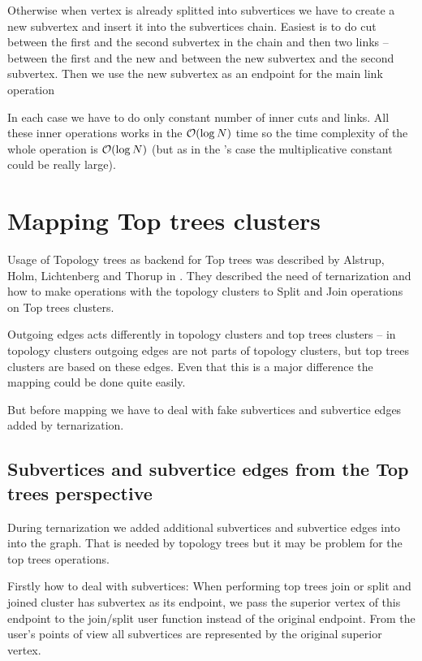 Otherwise when vertex is already splitted into subvertices we have to create
a new subvertex and insert it into the subvertices chain. Easiest is to do cut
between the first and the second subvertex in the chain and then two links --
between the first and the new and between the new subvertex and the second subvertex.
Then we use the new subvertex as an endpoint for the main link operation

In each case we have to do only constant number of inner cuts and links. All
these inner operations works in the ${\cal O}(\log N)$ time so the time complexity of
the whole \Link{} operation is ${\cal O}(\log N)$ (but as in the \Cut's case the
multiplicative constant could be really large).

\section{Mapping Top trees clusters}

Usage of Topology trees as backend for Top trees was described by Alstrup, Holm,
Lichtenberg and Thorup in \cite{TopTrees}. They described the need of
ternarization and how to make operations with the topology clusters to Split and
Join operations on Top trees clusters.

Outgoing edges acts differently in topology clusters and top trees clusters --
in topology clusters outgoing edges are not parts of topology clusters, but
top trees clusters are based on these edges. Even that this is a major
difference the mapping could be done quite easily.

But before mapping we have to deal with fake subvertices and subvertice edges
added by ternarization.

\subsection{Subvertices and subvertice edges from the Top trees perspective}

During ternarization we added additional subvertices and subvertice edges
into into the graph. That is needed by topology trees but it may be problem for
the top trees operations.

Firstly how to deal with subvertices: When performing top trees join or split
and joined cluster has subvertex as its endpoint, we pass the superior vertex
of this endpoint to the join/split user function instead of the original
endpoint. From the user's points of view all subvertices are represented by the
original superior vertex.

